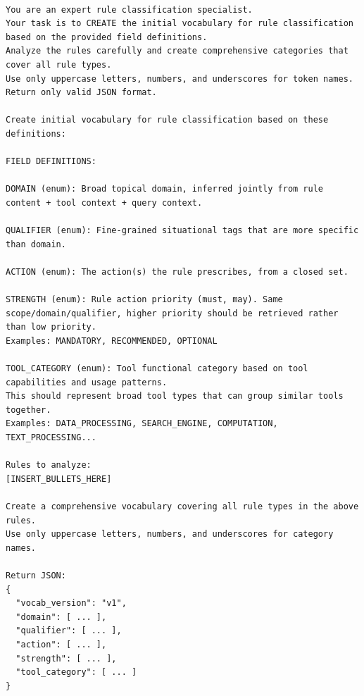 \documentclass[11pt]{article}
\begin{document}
\begin{lstlisting}[style=promptstyle, caption={Prompt used to induce the rule classification vocabulary from a batch of rules. Placeholders are filled dynamically.}]

You are an expert rule classification specialist.
Your task is to CREATE the initial vocabulary for rule classification based on the provided field definitions.
Analyze the rules carefully and create comprehensive categories that cover all rule types.
Use only uppercase letters, numbers, and underscores for token names.
Return only valid JSON format.

Create initial vocabulary for rule classification based on these definitions:

FIELD DEFINITIONS:

DOMAIN (enum): Broad topical domain, inferred jointly from rule content + tool context + query context.

QUALIFIER (enum): Fine-grained situational tags that are more specific than domain.

ACTION (enum): The action(s) the rule prescribes, from a closed set.

STRENGTH (enum): Rule action priority (must, may). Same scope/domain/qualifier, higher priority should be retrieved rather than low priority.
Examples: MANDATORY, RECOMMENDED, OPTIONAL

TOOL_CATEGORY (enum): Tool functional category based on tool capabilities and usage patterns.
This should represent broad tool types that can group similar tools together.
Examples: DATA_PROCESSING, SEARCH_ENGINE, COMPUTATION, TEXT_PROCESSING...

Rules to analyze:
[INSERT_BULLETS_HERE]

Create a comprehensive vocabulary covering all rule types in the above rules.
Use only uppercase letters, numbers, and underscores for category names.

Return JSON:
{
  "vocab_version": "v1",
  "domain": [ ... ],
  "qualifier": [ ... ],
  "action": [ ... ],
  "strength": [ ... ],
  "tool_category": [ ... ]
}
\end{lstlisting}
\end{document}
